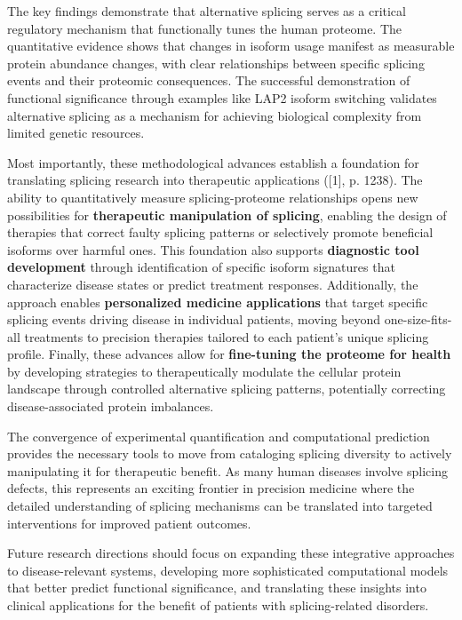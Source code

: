 \documentclass[12pt,a4paper]{article}
\begin{document}
The key findings demonstrate that alternative splicing serves as a critical regulatory mechanism that functionally tunes the human proteome. The quantitative evidence shows that changes in isoform usage manifest as measurable protein abundance changes, with clear relationships between specific splicing events and their proteomic consequences. The successful demonstration of functional significance through examples like LAP2 isoform switching validates alternative splicing as a mechanism for achieving biological complexity from limited genetic resources.

Most importantly, these methodological advances establish a foundation for translating splicing research into therapeutic applications ([1], p. 1238). The ability to quantitatively measure splicing-proteome relationships opens new possibilities for \textbf{therapeutic manipulation of splicing}, enabling the design of therapies that correct faulty splicing patterns or selectively promote beneficial isoforms over harmful ones. This foundation also supports \textbf{diagnostic tool development} through identification of specific isoform signatures that characterize disease states or predict treatment responses. Additionally, the approach enables \textbf{personalized medicine applications} that target specific splicing events driving disease in individual patients, moving beyond one-size-fits-all treatments to precision therapies tailored to each patient's unique splicing profile. Finally, these advances allow for \textbf{fine-tuning the proteome for health} by developing strategies to therapeutically modulate the cellular protein landscape through controlled alternative splicing patterns, potentially correcting disease-associated protein imbalances.

The convergence of experimental quantification and computational prediction provides the necessary tools to move from cataloging splicing diversity to actively manipulating it for therapeutic benefit. As many human diseases involve splicing defects, this represents an exciting frontier in precision medicine where the detailed understanding of splicing mechanisms can be translated into targeted interventions for improved patient outcomes.

Future research directions should focus on expanding these integrative approaches to disease-relevant systems, developing more sophisticated computational models that better predict functional significance, and translating these insights into clinical applications for the benefit of patients with splicing-related disorders.
\end{document}
